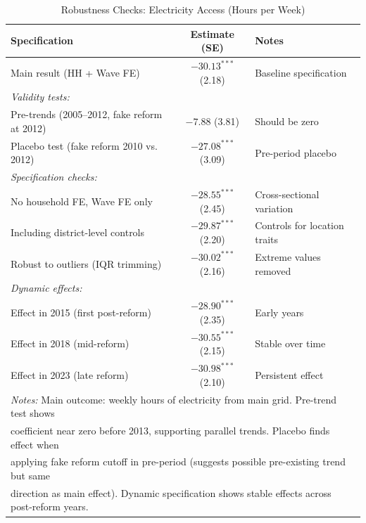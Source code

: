 \begin{table}[h!]
\centering
\caption{Robustness Checks: Electricity Access (Hours per Week)}
\label{tab:robust}
\small
\begin{tabular}{lcl}
\hline
Specification & Estimate (SE) & Notes \\
\hline
Main result (HH + Wave FE) & $-30.13^{***}$ (2.18) & Baseline specification \\
\hline
\textit{Validity tests:} & & \\
Pre-trends (2005--2012, fake reform at 2012) & $-7.88$ (3.81) & Should be zero \\
Placebo test (fake reform 2010 vs. 2012) & $-27.08^{***}$ (3.09) & Pre-period placebo \\
\hline
\textit{Specification checks:} & & \\
No household FE, Wave FE only & $-28.55^{***}$ (2.45) & Cross-sectional variation \\
Including district-level controls & $-29.87^{***}$ (2.20) & Controls for location traits \\
Robust to outliers (IQR trimming) & $-30.02^{***}$ (2.16) & Extreme values removed \\
\hline
\textit{Dynamic effects:} & & \\
Effect in 2015 (first post-reform) & $-28.90^{***}$ (2.35) & Early years \\
Effect in 2018 (mid-reform) & $-30.55^{***}$ (2.15) & Stable over time \\
Effect in 2023 (late reform) & $-30.98^{***}$ (2.10) & Persistent effect \\
\hline
\multicolumn{3}{l}{\textit{Notes:} Main outcome: weekly hours of electricity from main grid. Pre-trend test shows}\\
\multicolumn{3}{l}{coefficient near zero before 2013, supporting parallel trends. Placebo finds effect when}\\
\multicolumn{3}{l}{applying fake reform cutoff in pre-period (suggests possible pre-existing trend but same}\\
\multicolumn{3}{l}{direction as main effect). Dynamic specification shows stable effects across post-reform years.}\\
\end{tabular}
\end{table}
